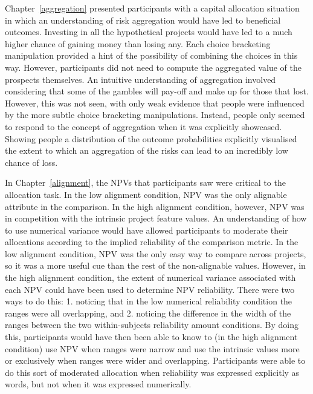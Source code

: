 \documentclass[a4paper, nobind, dvipsnames]{templates/ociamthesis}
\theoremstyle{definition}
\theoremstyle{definition}
\theoremstyle{definition}
\theoremstyle{definition}
\theoremstyle{remark}
\begin{document}
Chapter~\ref{aggregation} presented participants with a capital allocation
situation in which an understanding of risk aggregation would have led to
beneficial outcomes. Investing in all the hypothetical projects would have led
to a much higher chance of gaining money than losing any. Each choice bracketing
manipulation provided a hint of the possibility of combining the choices in this
way. However, participants did not need to compute the aggregated value of the
prospects themselves. An intuitive understanding of aggregation involved
considering that some of the gambles will pay-off and make up for those that
lost. However, this was not seen, with only weak evidence that people were
influenced by the more subtle choice bracketing manipulations. Instead, people
only seemed to respond to the concept of aggregation when it was explicitly
showcased. Showing people a distribution of the outcome probabilities explicitly
visualised the extent to which an aggregation of the risks can lead to an
incredibly low chance of loss.

In Chapter~\ref{alignment}, the NPVs that participants saw were critical to the
allocation task. In the low alignment condition, NPV was the only alignable
attribute in the comparison. In the high alignment condition, however, NPV was
in competition with the intrinsic project feature values. An understanding of
how to use numerical variance would have allowed participants to moderate their
allocations according to the implied reliability of the comparison metric. In
the low alignment condition, NPV was the only easy way to compare across
projects, so it was a more useful cue than the rest of the non-alignable values.
However, in the high alignment condition, the extent of numerical variance
associated with each NPV could have been used to determine NPV reliability.
There were two ways to do this: 1. noticing that in the low numerical
reliability condition the ranges were all overlapping, and 2. noticing the
difference in the width of the ranges between the two within-subjects
reliability amount conditions. By doing this, participants would have then been
able to know to (in the high alignment condition) use NPV when ranges were
narrow and use the intrinsic values more or exclusively when ranges were wider
and overlapping. Participants were able to do this sort of moderated allocation
when reliability was expressed explicitly as words, but not when it was
expressed numerically.
\end{document}
